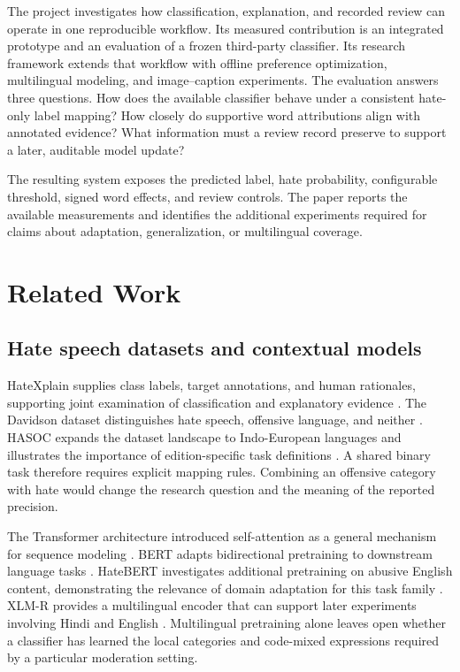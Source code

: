 \documentclass[11pt,a4paper]{article}
\begin{document}
The project investigates how classification, explanation, and recorded review
can operate in one reproducible workflow. Its measured contribution is an
integrated prototype and an evaluation of a frozen third-party classifier. Its
research framework extends that workflow with offline preference optimization,
multilingual modeling, and image--caption experiments. The evaluation answers
three questions. How does the available classifier behave under a consistent
hate-only label mapping? How closely do supportive word attributions align with
annotated evidence? What information must a review record preserve to support
a later, auditable model update?

The resulting system exposes the predicted label, hate probability, configurable
threshold, signed word effects, and review controls. The paper reports the
available measurements and identifies the additional experiments required for
claims about adaptation, generalization, or multilingual coverage.

\clearpage
\section{Related Work}
\subsection{Hate speech datasets and contextual models}
HateXplain supplies class labels, target annotations, and human rationales,
supporting joint examination of classification and explanatory evidence
\cite{hatexplain}. The Davidson dataset distinguishes hate speech, offensive
language, and neither \cite{davidson}. HASOC expands the dataset landscape to
Indo-European languages and illustrates the importance of edition-specific
task definitions \cite{hasoc}. A shared binary task therefore requires explicit
mapping rules. Combining an offensive category with hate would change the
research question and the meaning of the reported precision.

The Transformer architecture introduced self-attention as a general mechanism
for sequence modeling \cite{attention}. BERT adapts bidirectional pretraining
to downstream language tasks \cite{bert}. HateBERT investigates additional
pretraining on abusive English content, demonstrating the relevance of domain
adaptation for this task family \cite{hatebert}. XLM-R provides a multilingual
encoder that can support later experiments involving Hindi and English
\cite{xlmr}. Multilingual pretraining alone leaves open whether a classifier
has learned the local categories and code-mixed expressions required by a
particular moderation setting.
\end{document}
